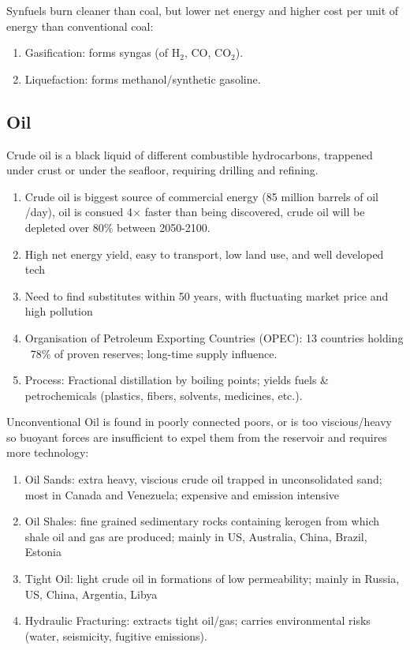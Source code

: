 \documentclass[12pt, a4paper]{article}
\begin{document}
\begin{multicols*}{3}
Synfuels burn cleaner than coal, but lower net energy and higher cost per unit of energy than conventional coal:
\begin{enumerate}[\roman*.]
  \item Gasification: forms syngas (of H$_2$, CO, CO$_2$). 
  \item Liquefaction: forms methanol/synthetic gasoline.
\end{enumerate}

\colbreak
\subsection{Oil}
Crude oil is a black liquid of different combustible hydrocarbons, trappened under crust or under the seafloor, requiring drilling and refining.
\begin{enumerate}[\roman*.]
  \item Crude oil is biggest source of commercial energy (85 million barrels of oil /day), oil is consued 4$\times$ faster than being discovered, crude oil will be depleted over 80\% between 2050-2100.
  \item High net energy yield, easy to transport, low land use, and well developed tech
  \item Need to find substitutes within 50 years, with fluctuating market price and high pollution
  \item Organisation of Petroleum Exporting Countries (OPEC): 13 countries holding ~78\% of proven reserves; long-time supply influence. 
  \item Process: Fractional distillation by boiling points; yields fuels \& {petrochemicals} (plastics, fibers, solvents, medicines, etc.). 
\end{enumerate}

Unconventional Oil is found in poorly connected poors, or is too viscious/heavy so buoyant forces are insufficient to expel them from the reservoir and requires more technology:
\begin{enumerate}[\roman*.]
  \item Oil Sands: extra heavy, viscious crude oil trapped in unconsolidated sand; most in Canada and Venezuela; expensive and emission intensive
  \item Oil Shales: fine grained sedimentary rocks containing kerogen from which shale oil and gas are produced; mainly in US, Australia, China, Brazil, Estonia
  \item Tight Oil: light crude oil in formations of low permeability; mainly in Russia, US, China, Argentia, Libya
  \item Hydraulic Fracturing: extracts tight oil/gas; carries environmental risks (water, seismicity, fugitive emissions). 
\end{enumerate}


\end{multicols*}
\end{document}
